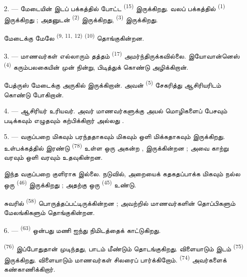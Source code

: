 2. --- மேடையின் இடப் பக்கத்தில்  போட்ட 
\textsuperscript{(15)} இருக்கிறது. வலப் பக்கத்தில் 
\textsuperscript{(1)} இருக்கிறது ; அதனுடன் 
\textsuperscript{(2)} இருக்கிறது, 
\textsuperscript{(3)} இருக்கிறது.

மேடைக்கு மேலே  \textsuperscript{(9, 11,}
\textsuperscript{12)}  \textsuperscript{(10)} தொங்குகின்றன.

3. --- மாணவர்கள் எல்லாரும் தத்தம்  \textsuperscript{(17)}
அமர்ந்திருக்கவில்லை. இயோவான்னெஸ் \textsuperscript{(4)} கரும்பலகையின் முன்
நின்று,  பிடித்துக் கொண்டு 
அழிக்கிறான்.

பேத்ருஸ் மேடைக்கு அருகில் இருக்கிறான். அவன் 
\textsuperscript{(5)} சேகரித்து ஆசிரியரிடம் கொண்டு போகிறான்.

4. ---  ஆசிரியர்  உரியவர். அவர்
மாணவர்களுக்கு அயல் மொழிகளைப் பேசவும் படிக்கவும் எழுதவும் கற்பிக்கிறார்
 அல்லது
.

5. --- வகுப்பறை மிகவும் பரந்ததாகவும் மிகவும் ஒளி மிக்கதாகவும் இருக்கிறது.
உள்பக்கத்தில் இரண்டு  \textsuperscript{(78)} உள்ள ஒரு
அகன்ற ,  இருக்கின்றன ; அவை காற்று
வரவும் ஒளி வரவும் உதவுகின்றன.

இந்த வகுப்பறை குளிராக இல்லை. நடுவில், அறையைக் கதகதப்பாக்க மிகவும் நல்ல ஒரு
 \textsuperscript{(46)} இருக்கிறது ; அதற்கு ஒரு
 \textsuperscript{(45)} உண்டு.

சுவரில்  \textsuperscript{(58)} பொருத்தப்பட்டிருக்கின்றன ;
அவற்றில் மாணவர்களின் தொப்பிகளும் மேலங்கிகளும் தொங்குகின்றன.

\VUsaut{5.2mm}
\VUsaut{3.6mm}

6. ---  \textsuperscript{(63)} ஒன்பது மணி ஐந்து நிமிடத்தைக்
காட்டுகிறது.

 \textsuperscript{(76)} இப்போதுதான் முடிந்தது, பாடம் மீண்டும்
தொடங்குகிறது. விளையாடும் இடம்  \textsuperscript{(75)}
இருக்கிறது. விளையாடும் மாணவர்கள் சிலரைப் பார்க்கிறோம்.
 \textsuperscript{(74)} அவர்களைக் கண்காணிக்கிறார்.

